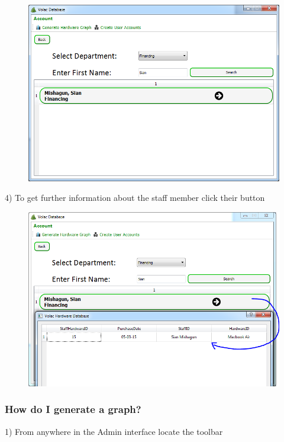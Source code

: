 \begin{figure}[H]
    \includegraphics[width=\textwidth]{./Manual/Images/searchdep3.png}
\end{figure}

4) To get further information about the staff member click their button

\begin{figure}[H]
    \includegraphics[width=\textwidth]{./Manual/Images/searchdep4.png}
\end{figure}

\subsubsection{How do I generate a graph?}

1) From anywhere in the Admin interface locate the toolbar

